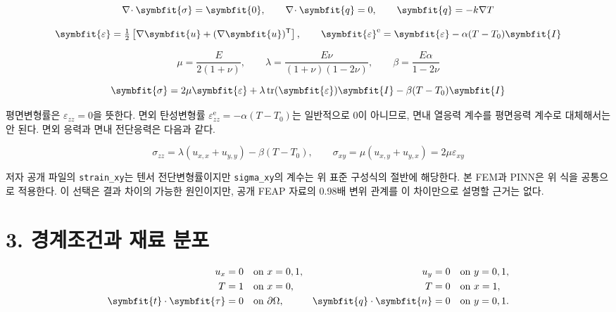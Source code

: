 \documentclass[10pt,a4paper]{article}
\renewcommand{\boldsymbol}[1]{\symbfit{#1}}
\begin{document}
\begin{equation}\nabla\!\cdot\boldsymbol\sigma=\boldsymbol0,\qquad\nabla\!\cdot\boldsymbol q=0,\qquad\boldsymbol q=-k\nabla T\end{equation}

\begin{equation}\boldsymbol\varepsilon=\tfrac12\left[\nabla\boldsymbol u+(\nabla\boldsymbol u)^{\mathsf T}\right],\qquad\boldsymbol\varepsilon^{\mathrm e}=\boldsymbol\varepsilon-\alpha(T-T_0)\boldsymbol I\end{equation}

\begin{equation}\mu=\frac{E}{2(1+\nu)},\qquad\lambda=\frac{E\nu}{(1+\nu)(1-2\nu)},\qquad\beta=\frac{E\alpha}{1-2\nu}\end{equation}

\begin{equation}\boldsymbol\sigma=2\mu\boldsymbol\varepsilon+\lambda\operatorname{tr}(\boldsymbol\varepsilon)\boldsymbol I-\beta(T-T_0)\boldsymbol I\end{equation}

평면변형률은 $\varepsilon_{zz}=0$을 뜻한다. 면외 탄성변형률 $\varepsilon^{\mathrm e}_{zz}=-\alpha(T-T_0)$는 일반적으로 0이 아니므로, 면내 열응력 계수를 평면응력 계수로 대체해서는 안 된다. 면외 응력과 면내 전단응력은 다음과 같다.\par

\begin{equation}\sigma_{zz}=\lambda(u_{x,x}+u_{y,y})-\beta(T-T_0),\qquad\sigma_{xy}=\mu(u_{x,y}+u_{y,x})=2\mu\varepsilon_{xy}\end{equation}

저자 공개 파일의 \nolinkurl{strain_xy}는 텐서 전단변형률이지만 \nolinkurl{sigma_xy}의 계수는 위 표준 구성식의 절반에 해당한다. 본 FEM과 PINN은 위 식을 공통으로 적용한다. 이 선택은 결과 차이의 가능한 원인이지만, 공개 FEAP 자료의 0.98배 변위 관계를 이 차이만으로 설명할 근거는 없다.\par

\clearpage

\section{3. 경계조건과 재료 분포}

\begin{equation}\begin{aligned}u_x&=0 &&\text{on }x=0,1,& u_y&=0 &&\text{on }y=0,1,\\ T&=1 &&\text{on }x=0,& T&=0 &&\text{on }x=1,\\\boldsymbol t\cdot\boldsymbol\tau&=0 &&\text{on }\partial\Omega,&\boldsymbol q\cdot\boldsymbol n&=0 &&\text{on }y=0,1.\end{aligned}\end{equation}
\end{document}
